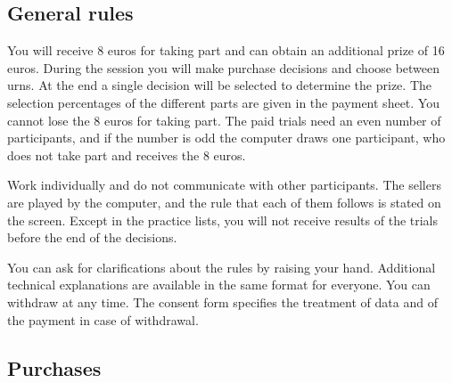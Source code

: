 \documentclass[11pt,a4paper]{article}
\begin{document}
\subsection{General rules}

{\small
You will receive 8 euros for taking part and can obtain an additional prize of 16 euros. During the session you will make purchase decisions and choose between urns. At the end a single decision will be selected to determine the prize. The selection percentages of the different parts are given in the payment sheet. You cannot lose the 8 euros for taking part. The paid trials need an even number of participants, and if the number is odd the computer draws one participant, who does not take part and receives the 8 euros.

Work individually and do not communicate with other participants. The sellers are played by the computer, and the rule that each of them follows is stated on the screen. Except in the practice lists, you will not receive results of the trials before the end of the decisions.

You can ask for clarifications about the rules by raising your hand. Additional technical explanations are available in the same format for everyone. You can withdraw at any time. The consent form specifies the treatment of data and of the payment in case of withdrawal.

}

\subsection{Purchases}
\end{document}
